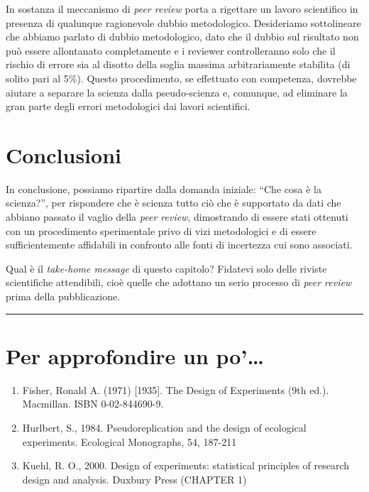 \documentclass[a4paper,12pt,oneside]{book}
\providecommand{\tightlist}{%
  \setlength{\itemsep}{0pt}\setlength{\parskip}{0pt}}
\begin{document}
In sostanza il meccanismo di \emph{peer review} porta a rigettare un lavoro scientifico in presenza di qualunque ragionevole dubbio metodologico. Desideriamo sottolineare che abbiamo parlato di dubbio metodologico, dato che il dubbio sul risultato non può essere allontanato completamente e i reviewer controlleranno solo che il rischio di errore sia al disotto della soglia massima arbitrariamente stabilita (di solito pari al 5\%).
Questo procedimento, se effettuato con competenza, dovrebbe aiutare a separare la scienza dalla pseudo-scienza e, comunque, ad eliminare la gran parte degli errori metodologici dai lavori scientifici.

\hypertarget{conclusioni}{%
\section{Conclusioni}\label{conclusioni}}

In conclusione, possiamo ripartire dalla domanda iniziale: ``Che cosa è la scienza?'', per rispondere che è scienza tutto ciò che è supportato da dati che abbiano passato il vaglio della \emph{peer review}, dimostrando di essere stati ottenuti con un procedimento sperimentale privo di vizi metodologici e di essere sufficientemente affidabili in confronto alle fonti di incertezza cui sono associati.

Qual è il \emph{take-home message} di questo capitolo? Fidatevi solo delle riviste scientifiche attendibili, cioè quelle che adottano un serio processo di \emph{peer review} prima della pubblicazione.

\begin{center}\rule{0.5\linewidth}{\linethickness}\end{center}

\hypertarget{per-approfondire-un-po}{%
\section{Per approfondire un po'\ldots{}}\label{per-approfondire-un-po}}

\begin{enumerate}
\def\labelenumi{\arabic{enumi}.}
\tightlist
\item
  Fisher, Ronald A. (1971) {[}1935{]}. The Design of Experiments (9th ed.). Macmillan. ISBN 0-02-844690-9.
\item
  Hurlbert, S., 1984. Pseudoreplication and the design of ecological experiments. Ecological Monographs, 54, 187-211
\item
  Kuehl, R. O., 2000. Design of experiments: statistical principles of research design and analysis. Duxbury Press (CHAPTER 1)
\end{enumerate}
\end{document}

